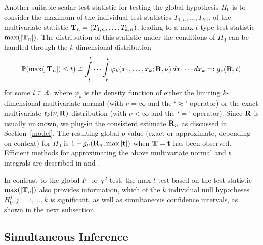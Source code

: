 \documentclass[bimj,fleqn]{w-art}
\begin{document}
Another suitable scalar test statistic for testing the global hypothesis $H_0
$ is to consider the maximum of the individual test statistics $T_{1,n}, \dots,
T_{k,n}$ of the multivariate statistic $\mathbf{T}_n = (T_{1,n}, \dots, T_{k,n})$, leading to a max-$t$ type
test statistic $\max(|\mathbf{T}_n|)$. The distribution of this statistic under the
conditions of $H_0$ can be handled through the $k$-dimensional distribution 
\begin{eqnarray}  \label{maxt}
\mathbb{P}(\max(|\mathbf{T}_n|) \le t) \cong \int\limits_{-t}^t \cdots \int\limits_{-t}^t
\varphi_k(x_1, \dots, x_k; \mathbf{R}, \nu) \, dx_1 \cdots dx_k =: g_\nu(\mathbf{R}, t)
\end{eqnarray}
for some $t \in \mathbb{R}$, where $\varphi_k$ is the density function of either the
limiting $k$-dimensional multivariate normal (with $\nu = \infty$ and the `$%
\approx$' operator) or the exact multivariate $t_k(\nu, \mathbf{R})$-distribution
(with $\nu < \infty$ and the `$=$' operator). Since $\mathbf{R}$ is usually
unknown, we plug-in the consistent estimate $\mathbf{R}_n$ as discussed in
Section~\ref{model}.
The resulting global $p$-value 
(exact or approximate, depending on context) 
for $H_0$ is $1 - g_\nu(\mathbf{R}_n, \max|\mathbf{t}|)$ when $\mathbf{T} = \mathbf{t}$ has been observed. 
Efficient methods
for approximating the above multivariate normal and $t$ integrals are
described in \cite{Genz1992,GenzBretz1999,BretzGenzHothorn2001} and \cite%
{GenzBretz2002}. %

In contrast to the global $F$- or $\chi^2$-test, the max-$t$ test
based on the test statistic $\max(|\mathbf{T}_n|)$ also provides information, 
which of the $k$ individual null hypotheses $%
H_0^j, j = 1, \dots, k$ is significant,
as well as simultaneous confidence intervals, as shown in the next
subsection.

\subsection{Simultaneous Inference}

\label{simtest} %
\end{document}
